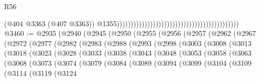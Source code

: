\begin{lexlean}{R56}
\begin{coremodule}
                                                                                            (@404
                                                                                              @3363
                                                                                              (@407
                                                                                                @3363))
                                                                                            @1355))))))))))))))))))))))))))))))))))))))))))))
@3460 := @2935
    (@2940
      (@2945
        (@2950
          (@2955
            (@2956
              (@2957
                (@2962
                  (@2967
                    (@2972
                      (@2977
                        (@2982
                          (@2983
                            (@2988
                              (@2993
                                (@2998
                                  (@3003
                                    (@3008
                                      (@3013
                                        (@3018
                                          (@3023
                                            (@3028
                                              (@3033
                                                (@3038
                                                  (@3043
                                                    (@3048
                                                      (@3053
                                                        (@3058
                                                          (@3063
                                                            (@3068
                                                              (@3073
                                                                (@3074
                                                                  (@3079
                                                                    (@3084
                                                                      (@3089
                                                                        (@3094
                                                                          (@3099
                                                                            (@3104
                                                                              (@3109
                                                                                (@3114
                                                                                  (@3119
                                                                                    (@3124

\end{coremodule}
\end{lexlean}
